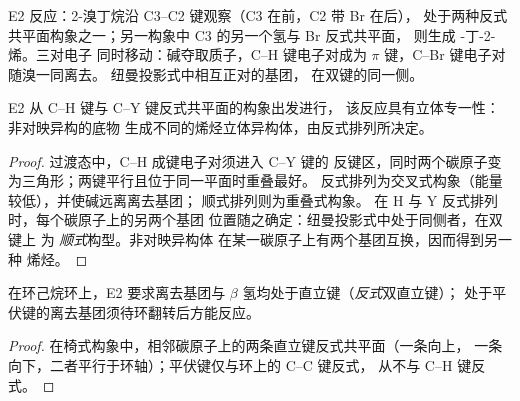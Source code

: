 \begin{omfigure}

{\small E2 反应：2-溴丁烷沿 C3--C2 键观察（C3 在前，C2 带 Br 在后），
处于两种反式共平面构象之一；另一构象中 C3 的另一个氢与 Br 反式共平面，
则生成 -丁-2-烯。三对电子
同时移动：碱夺取质子，C--H 键电子对成为
$\pi$ 键，C--Br 键电子对随溴一同离去。
纽曼投影式中相互正对的基团，
在双键的同一侧。}
\end{omfigure}

\begin{proposition}[E2 反式且立体专一]\label{prop:b1:elimination:anti}
E2 从 C--H 键与 C--Y 键反式共平面的构象出发进行，
该反应具有立体专一性：非对映异构的底物
生成不同的烯烃立体异构体，由反式排列所决定。
\end{proposition}

\begin{proof}
过渡态中，C--H 成键电子对须进入 C--Y 键的
反键区，同时两个碳原子变为三角形；两键平行且位于同一平面时重叠最好。
反式排列为交叉式构象（能量较低），并使碱远离离去基团；
顺式排列则为重叠式构象。
在 H 与 Y 反式排列时，每个碳原子上的另两个基团
位置随之确定：纽曼投影式中处于同侧者，在双键上
为 \textit{顺式}构型。非对映异构体
在某一碳原子上有两个基团互换，因而得到另一种
烯烃。
\end{proof}

\begin{proposition}[环己烷上的 E2]\label{prop:b1:elimination:cyclohexane-e2}
在环己烷环上，E2 要求离去基团与 $\beta$
氢均处于直立键（\textit{反式}双直立键）；
处于平伏键的离去基团须待环翻转后方能反应。
\end{proposition}

\begin{proof}
在椅式构象中，相邻碳原子上的两条直立键反式共平面（一条向上，
一条向下，二者平行于环轴）；平伏键仅与环上的 C--C 键反式，
从不与 C--H 键反式。
\end{proof}

